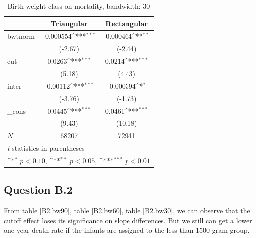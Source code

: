 \documentclass[a4paper,11pt]{article}
\begin{document}
\begin{table}[htbp]\centering
\def\sym#1{\ifmmode^{#1}\else\(^{#1}\)\fi}
\caption{Birth weight class on mortality, bandwidth: 30}
\label{B1.bw30}
\begin{tabular}{l*{2}{c}}
\hline\hline
            &\multicolumn{1}{c}{Triangular}&\multicolumn{1}{c}{Rectangular}\\
\hline
bwtnorm     &   -0.000554\sym{***}&   -0.000464\sym{**} \\
            &     (-2.67)         &     (-2.44)         \\
[1em]
cut         &      0.0263\sym{***}&      0.0214\sym{***}\\
            &      (5.18)         &      (4.43)         \\
[1em]
inter       &    -0.00112\sym{***}&   -0.000394\sym{*}  \\
            &     (-3.76)         &     (-1.73)         \\
[1em]
\_cons      &      0.0445\sym{***}&      0.0461\sym{***}\\
            &      (9.43)         &     (10.18)         \\
\hline
\(N\)       &       68207         &       72941         \\
\hline\hline
\multicolumn{3}{l}{\footnotesize \textit{t} statistics in parentheses}\\
\multicolumn{3}{l}{\footnotesize \sym{*} \(p<0.10\), \sym{**} \(p<0.05\), \sym{***} \(p<0.01\)}\\
\end{tabular}
\end{table}

\subsection*{Question B.2}

From table \ref{B2.bw90}, table \ref{B2.bw60}, table \ref{B2.bw30}, we can observe that the cutoff effect loses its significance on slope differences. But we still can get a lower one year death rate if the infants are assigned to the less than 1500 gram group.

\end{document}
